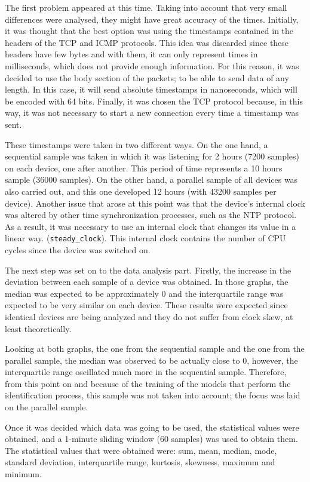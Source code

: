 The first problem appeared at this time. Taking into account that very small differences were analysed, they might have great accuracy of the times. Initially, it was thought that the best option was using the timestamps contained in the headers of the TCP and ICMP protocols. This idea was discarded since these headers have few bytes and with them, it can only represent times in milliseconds, which does not provide enough information. For this reason, it was decided to use the body section of the packets; to be able to send data of any length. In this case, it will send absolute timestamps in nanoseconds, which will be encoded with 64 bits. Finally, it was chosen the TCP protocol because, in this way, it was not necessary to start a new connection every time a timestamp was sent.


These timestamps were taken in two different ways. On the one hand, a sequential sample was taken in which it was listening for 2 hours (7200 samples) on each device, one after another. This period of time represents a 10 hours sample (36000 samples). On the other hand, a parallel sample of all devices was also carried out, and this one developed 12 hours (with 43200 samples per device). Another issue that arose at this point was that the device's internal clock was altered by other time synchronization processes, such as the NTP protocol. As a result, it was necessary to use an internal clock that changes its value in a linear way. (\texttt{steady\_clock}). This internal clock contains the number of CPU cycles since the device was switched on.

The next step was set on to the data analysis part. Firstly, the increase in the deviation between each sample of a device was obtained. In those graphs, the median was expected to be approximately 0 and the interquartile range was expected to be very similar on each device. These results were expected since identical devices are being analyzed and they do not suffer from clock skew, at least theoretically.

Looking at both graphs, the one from the sequential sample and the one from the parallel sample, the median was observed to be actually close to 0, however, the interquartile range oscillated much more in the sequential sample. Therefore, from this point on and because of the training of the models that perform the identification process, this sample was not taken into account; the focus was laid on the parallel sample.

Once it was decided which data was going to be used, the statistical values were obtained, and a 1-minute sliding window (60 samples) was used to obtain them. The statistical values that were obtained were: sum, mean, median, mode, standard deviation, interquartile range, kurtosis, skewness, maximum and minimum.

